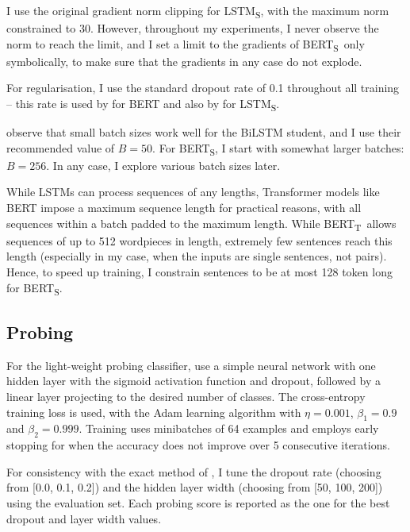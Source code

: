 \documentclass[bsc,frontabs,twoside,singlespacing,parskip,deptreport]{infthesis}
\def\BERTT{BERT\textsubscript{T}}
\def\BERTS{BERT\textsubscript{S}}
\def\LSTMS{LSTM\textsubscript{S}}
\begin{document}
{{{      I use the original gradient norm clipping for \LSTMS, with the maximum norm constrained to 30. However, throughout my experiments, I never observe the norm to reach the limit, and I set a limit to the gradients of \BERTS~only symbolically, to make sure that the gradients in any case do not explode.

      For regularisation, I use the standard dropout rate of 0.1 throughout all training -- this rate is used by \citet{Devlin_2018} for BERT and also by \citeauthor{Tang_2019b} for \LSTMS.

      \citeauthor{Tang_2019b} observe that small batch sizes work well for the BiLSTM student, and I use their recommended value of $B=50$. For \BERTS, I start with somewhat larger batches: $B=256$. In any case, I explore various batch sizes later.

      While LSTMs can process sequences of any lengths, Transformer models like BERT impose a maximum sequence length for practical reasons, with all sequences within a batch padded to the maximum length. While \BERTT~allows sequences of up to 512 wordpieces in length, extremely few sentences reach this length (especially in my case, when the inputs are single sentences, not pairs). Hence, to speed up training, I constrain sentences to be at most 128 token long for \BERTS.
    }

    \subsection{Probing}{
      For the light-weight probing classifier, \citet{Conneau_2018} use a simple neural network with one hidden layer with the sigmoid activation function and dropout, followed by a linear layer projecting to the desired number of classes. The cross-entropy training loss is used, with the Adam learning algorithm with $\eta=0.001$, $\beta_1=0.9$ and $\beta_2=0.999$. Training uses minibatches of 64 examples and employs early stopping for when the accuracy does not improve over 5 consecutive iterations.

      For consistency with the exact method of \citeauthor{Conneau_2018}, I tune the dropout rate (choosing from [0.0, 0.1, 0.2]) and the hidden layer width (choosing from [50, 100, 200]) using the evaluation set. Each probing score is reported as the one for the best dropout and layer width values.

}}}
\end{document}
